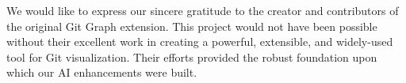We would like to express our sincere gratitude to the creator and contributors of the original Git Graph extension. This project would not have been possible without their excellent work in creating a powerful, extensible, and widely-used tool for Git visualization. Their efforts provided the robust foundation upon which our AI enhancements were built. 